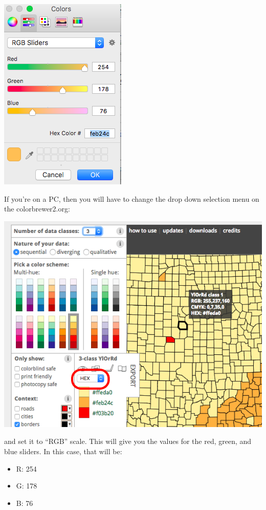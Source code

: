 \documentclass[
]{book}
\providecommand{\tightlist}{%
  \setlength{\itemsep}{0pt}\setlength{\parskip}{0pt}}
\begin{document}
\includegraphics{imgs/manual_fill_5.png}

If you're on a PC, then you will have to change the drop down selection menu on the colorbrewer2.org:

\includegraphics{imgs/choose_col_code.png}

and set it to ``RGB'' scale. This will give you the values for the red, green, and blue sliders. In this case, that will be:

\begin{itemize}
\tightlist
\item
  R: 254
\item
  G: 178
\item
  B: 76
\end{itemize}
\end{document}
